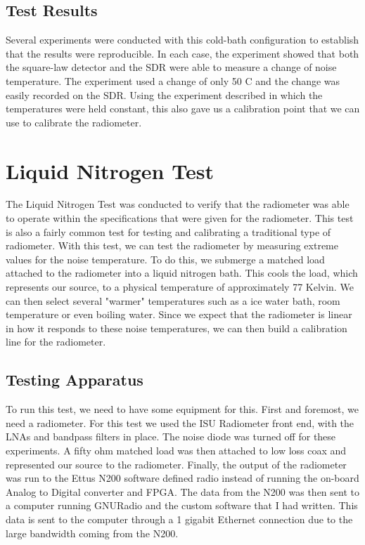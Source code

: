 \subsection{Test Results}

Several experiments were conducted with this cold-bath configuration to establish that the results were reproducible.  In each case, the experiment showed that both the square-law detector and the SDR were able to measure a change of noise temperature.  The experiment used a change of only 50 C and the change was easily recorded on the SDR.  Using the experiment described in which the temperatures were held constant, this also gave us a calibration point that we can use to calibrate the radiometer.

\section{Liquid Nitrogen Test}
The Liquid Nitrogen Test was conducted to verify that the radiometer was able to operate within the specifications that were given for the radiometer.  This test is also a fairly common test for testing and calibrating a traditional type of radiometer.  With this test, we can test the radiometer by measuring extreme values for the noise temperature.  To do this, we submerge a matched load attached to the radiometer into a liquid nitrogen bath.  This cools the load, which represents our source, to a physical temperature of approximately 77 Kelvin.  We can then select several "warmer" temperatures such as a ice water bath, room temperature or even boiling water.  Since we expect that the radiometer is linear in how it responds to these noise temperatures, we can then build a calibration line for the radiometer.

\subsection{Testing Apparatus}
To run this test, we need to have some equipment for this.  First and foremost, we need a radiometer.  For this test we used the ISU Radiometer front end, with the LNAs and bandpass filters in place.  The noise diode was turned off for these experiments.  A fifty ohm matched load was then attached to low loss coax and represented our source to the radiometer.  Finally, the output of the radiometer was run to the Ettus N200 software defined radio instead of running the on-board Analog to Digital converter and FPGA.  The data from the N200 was then sent to a computer running GNURadio and the custom software that I had written.  This data is sent to the computer through a 1 gigabit Ethernet connection due to the large bandwidth coming from the N200.

